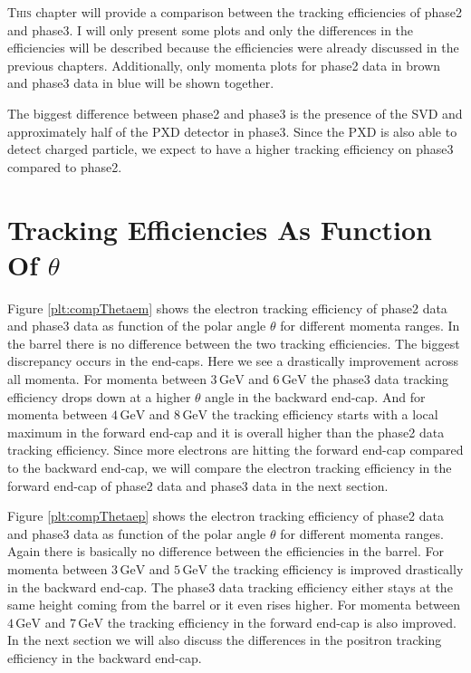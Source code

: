 \documentclass[a4paper,11pt,twosided,final,german,openbib,pdftex,listof=totoc,bibliography=totoc]{scrbook}
\begin{document}
\lettrine{T}{his} chapter will provide a comparison between the tracking efficiencies of phase2 and phase3. I will only present some plots and only the differences in the efficiencies will be described because the efficiencies were already discussed in the previous chapters. Additionally, only momenta plots for phase2 data in brown and phase3 data in blue will be shown together.
\newline

The biggest difference between phase2 and phase3 is the presence of the SVD and approximately half of the PXD detector in phase3.
Since the PXD is also able to detect charged particle, we expect to have a higher tracking efficiency on phase3 compared to phase2.

\section{Tracking Efficiencies As Function Of $\theta$}


Figure \ref{plt:compThetaem} shows the electron tracking efficiency of phase2 data and phase3 data as function of the polar angle $\theta$ for different momenta ranges. In the barrel there is no difference between the two tracking efficiencies. The biggest discrepancy occurs in the end-caps. Here we see a drastically improvement across all momenta. 
For momenta between $3\,\textrm{GeV}$ and $6\,\textrm{GeV}$ the phase3 data tracking efficiency drops down at a higher $\theta$ angle in the backward end-cap. 
And for momenta between $4\,\textrm{GeV}$ and $8\,\textrm{GeV}$ the tracking efficiency starts with a local maximum in the forward end-cap and it is overall higher than the phase2 data tracking efficiency. Since more electrons are hitting the forward end-cap compared to the backward end-cap, we will compare the electron tracking efficiency in the forward end-cap of phase2 data and phase3 data in the next section. 


Figure \ref{plt:compThetaep} shows the electron tracking efficiency of phase2 data and phase3 data as function of the polar angle $\theta$ for different momenta ranges. Again there is basically no difference between the efficiencies in the barrel. 
For momenta between $3\,\textrm{GeV}$ and $5\,\textrm{GeV}$ the tracking efficiency is improved drastically in the backward end-cap. The phase3 data tracking efficiency either stays at the same height coming from the barrel or it even rises higher. 
For momenta between $4\,\textrm{GeV}$ and $7\,\textrm{GeV}$ the tracking efficiency in the forward end-cap is also improved. In the next section we will also discuss the differences in the positron tracking efficiency in the backward end-cap.
\end{document}
